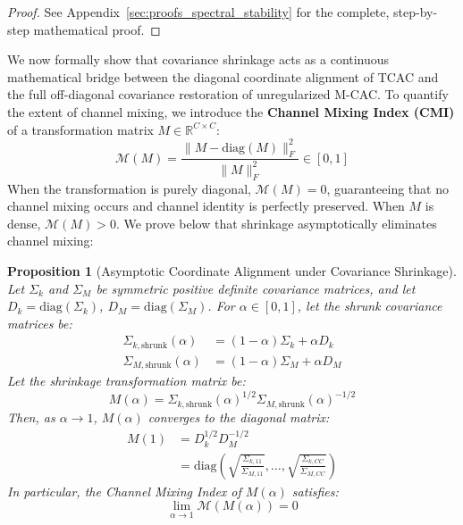 \documentclass{article}
\theoremstyle{plain}
\newtheorem{proposition}[theorem]{Proposition}
\theoremstyle{definition}
\theoremstyle{remark}
\begin{document}
\begin{proof}
See Appendix~\ref{sec:proofs_spectral_stability} for the complete, step-by-step mathematical proof.
\end{proof}

We now formally show that covariance shrinkage acts as a continuous mathematical bridge between the diagonal coordinate alignment of TCAC and the full off-diagonal covariance restoration of unregularized M-CAC. To quantify the extent of channel mixing, we introduce the \textbf{Channel Mixing Index (CMI)} of a transformation matrix $M \in \mathbb{R}^{C \times C}$:
\begin{equation}
  \mathcal{M}(M) = \frac{\| M - \text{diag}(M) \|_F^2}{\| M \|_F^2} \in [0, 1]
\end{equation}
When the transformation is purely diagonal, $\mathcal{M}(M) = 0$, guaranteeing that no channel mixing occurs and channel identity is perfectly preserved. When $M$ is dense, $\mathcal{M}(M) > 0$. We prove below that shrinkage asymptotically eliminates channel mixing:

\begin{proposition}[Asymptotic Coordinate Alignment under Covariance Shrinkage]
Let $\Sigma_k$ and $\Sigma_M$ be symmetric positive definite covariance matrices, and let $D_k = \text{diag}(\Sigma_k)$, $D_M = \text{diag}(\Sigma_M)$. For $\alpha \in [0, 1]$, let the shrunk covariance matrices be:
\begin{align*}
  \Sigma_{k,\text{shrunk}}(\alpha) &= (1 - \alpha) \Sigma_k + \alpha D_k \\
  \Sigma_{M,\text{shrunk}}(\alpha) &= (1 - \alpha) \Sigma_M + \alpha D_M
\end{align*}
Let the shrinkage transformation matrix be:
\begin{equation}
  M(\alpha) = \Sigma_{k,\text{shrunk}}(\alpha)^{1/2} \Sigma_{M,\text{shrunk}}(\alpha)^{-1/2}
\end{equation}
Then, as $\alpha \to 1$, $M(\alpha)$ converges to the diagonal matrix:
\begin{align}
  M(1) &= D_k^{1/2} D_M^{-1/2} \nonumber \\
  &= \text{diag}\left( \sqrt{\frac{\Sigma_{k,11}}{\Sigma_{M,11}}}, \dots, \sqrt{\frac{\Sigma_{k,CC}}{\Sigma_{M,CC}}} \right)
\end{align}
In particular, the Channel Mixing Index of $M(\alpha)$ satisfies:
\begin{equation}
  \lim_{\alpha \to 1} \mathcal{M}(M(\alpha)) = 0
\end{equation}
\end{proposition}
\end{document}
